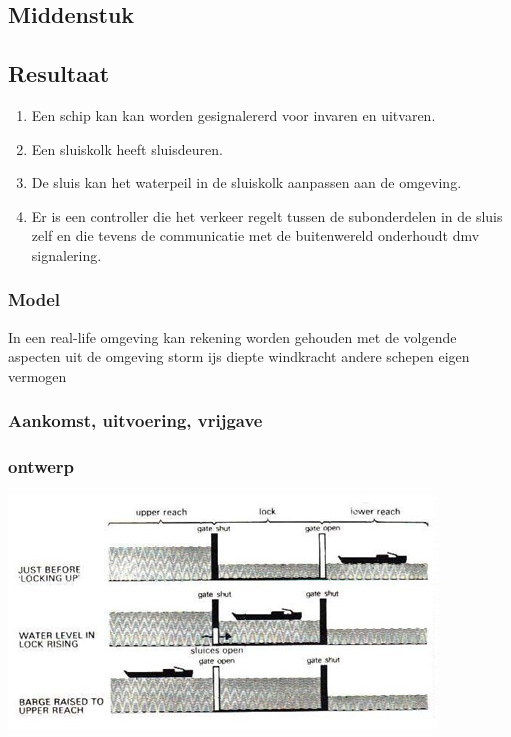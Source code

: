 \documentclass[11pt]{report} %
\begin{document}
\subsection{Middenstuk}

\subsection{Resultaat}

 \begin{enumerate}
 	\item Een schip kan kan worden gesignalererd voor invaren en uitvaren. 
	\item Een sluiskolk heeft sluisdeuren.  
	\item De sluis kan het waterpeil in de sluiskolk aanpassen aan de omgeving. 
    \item Er is een controller die het verkeer regelt tussen de subonderdelen in de sluis zelf en die tevens de communicatie met de buitenwereld onderhoudt dmv signalering.
\end{enumerate}




\subsubsection{Model}

In een real-life omgeving kan rekening worden gehouden met de volgende aspecten uit de omgeving
storm
ijs
diepte
windkracht
andere schepen
eigen vermogen

\subsubsection{Aankomst, uitvoering, vrijgave}


\subsubsection{ontwerp}

 \includegraphics[scale=0.65]{sluismodel.jpg}
 
\end{document}
